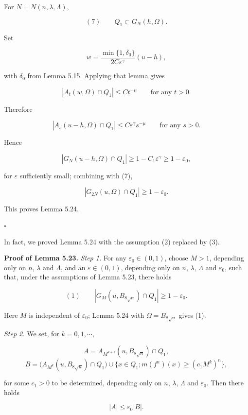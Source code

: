 For $N=N(n,\lambda,\Lambda)$,

\[
(7)\qquad Q_1\subset G_N(h,\Omega).
\]

Set

\[
w=\frac{\min\{1,\delta_0\}}{2C\varepsilon^\gamma}(u-h),
\]

with $\delta_0$ from Lemma 5.15. Applying that lemma gives

\[
|A_t(w,\Omega)\cap Q_1|\le Ct^{-\mu} \qquad \text{for any }t>0.
\]

Therefore

\[
|A_s(u-h,\Omega)\cap Q_1|\le C\varepsilon^\gamma s^{-\mu} \qquad \text{for any }s>0.
\]

Hence

\[
|G_N(u-h,\Omega)\cap Q_1|\ge 1-C_1\varepsilon^\gamma\ge 1-\varepsilon_0,
\]

for $\varepsilon$ sufficiently small; combining with (7),

\[
|G_{2N}(u,\Omega)\cap Q_1|\ge 1-\varepsilon_0.
\]

This proves Lemma 5.24.

\hfill$\square$

\begin{remark}\label{hanlin:ch05-rem-5-25} In fact, we proved Lemma 5.24 with the assumption (2) replaced
by (3).
\end{remark}

\textbf{Proof of Lemma 5.23.} \sketch \textit{Step 1.} For any $\varepsilon_0\in(0,1)$, choose $M>1$,
depending only on $n$, $\lambda$ and $\Lambda$, and an $\varepsilon\in(0,1)$, depending only on $n$, $\lambda$, $\Lambda$ and $\varepsilon_0$,
such that, under the assumptions of Lemma 5.23, there holds

\[
(1)\qquad |G_M(u,B_{8\sqrt n})\cap Q_1|\ge 1-\varepsilon_0.
\]

Here $M$ is independent of $\varepsilon_0$; Lemma 5.24 with $\Omega=B_{8\sqrt n}$ gives (1).

\textit{Step 2.} We set, for $k=0,1,\cdots$,

\[
A=A_{M^{k+1}}(u,B_{8\sqrt n})\cap Q_1,
\]
\[
B=\bigl(A_{M^k}(u,B_{8\sqrt n})\cap Q_1\bigr)\cup \{x\in Q_1;m(f^n)(x)\ge (c_1M^k)^n\},
\]

for some $c_1>0$ to be determined, depending only on $n$, $\lambda$, $\Lambda$ and $\varepsilon_0$. Then there
holds

\[
|A|\le \varepsilon_0|B|.
\]

